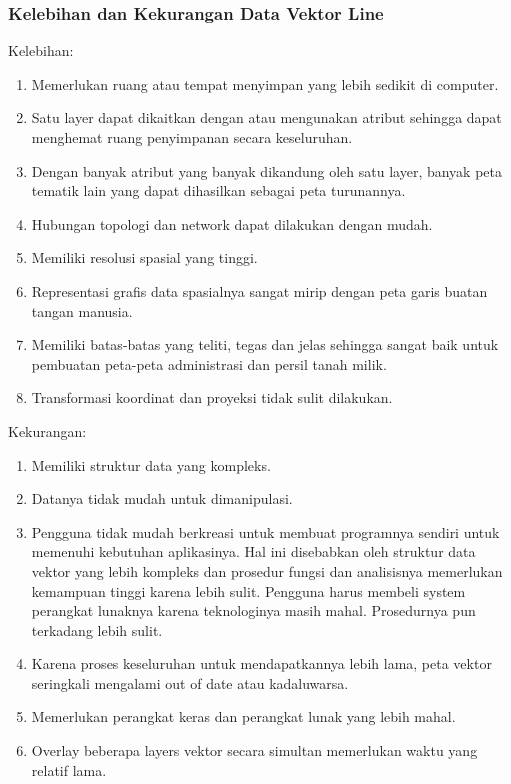  \subsubsection{Kelebihan dan Kekurangan Data Vektor Line}
 Kelebihan:
 \begin{enumerate}
    \item Memerlukan ruang atau tempat menyimpan yang lebih sedikit di computer.
    \item Satu layer dapat dikaitkan dengan atau mengunakan atribut sehingga dapat menghemat ruang penyimpanan secara keseluruhan.
    \item Dengan banyak atribut yang banyak dikandung oleh satu layer, 
             banyak peta tematik lain yang dapat dihasilkan sebagai peta turunannya.
    \item Hubungan topologi dan network dapat dilakukan dengan mudah.
    \item Memiliki resolusi spasial yang tinggi.
    \item Representasi grafis data spasialnya sangat mirip dengan peta garis buatan tangan manusia.
    \item Memiliki batas-batas yang teliti, tegas dan jelas sehingga sangat baik untuk 
    pembuatan peta-peta administrasi dan persil tanah milik.
    \item Transformasi koordinat dan proyeksi tidak sulit dilakukan. 
 \end{enumerate}
 Kekurangan:
 \begin{enumerate}
    \item Memiliki struktur data yang kompleks.
    \item Datanya tidak mudah untuk dimanipulasi.
    \item Pengguna tidak mudah berkreasi untuk membuat programnya sendiri untuk memenuhi kebutuhan aplikasinya. 
             Hal ini disebabkan oleh struktur data vektor yang lebih kompleks dan prosedur fungsi dan analisisnya 
             memerlukan kemampuan tinggi karena lebih sulit. 
            Pengguna harus membeli system perangkat lunaknya karena teknologinya masih mahal. Prosedurnya pun terkadang lebih sulit.
    \item Karena proses keseluruhan untuk mendapatkannya lebih lama, peta vektor seringkali mengalami out of date atau kadaluwarsa.
    \item Memerlukan perangkat keras dan perangkat lunak yang lebih mahal.
    \item Overlay beberapa layers vektor secara simultan memerlukan waktu yang relatif lama.
 \end{enumerate}
 
